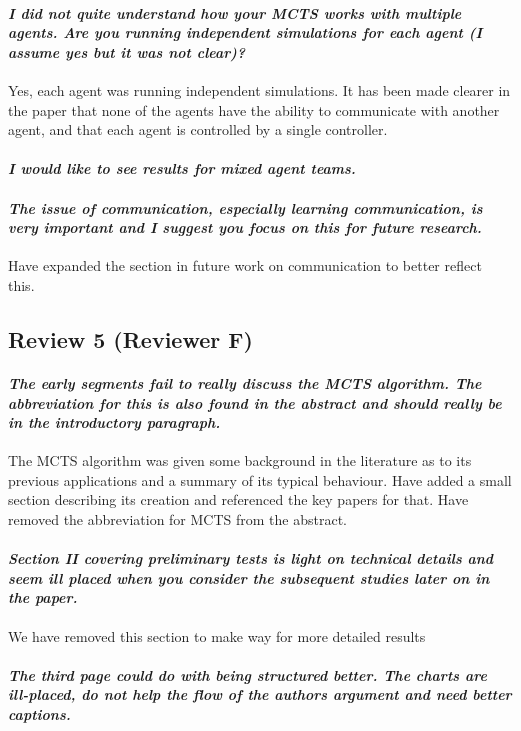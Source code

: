 \documentclass{article}
\begin{document}
\paragraph*{\textit{I did not quite understand how your MCTS works with multiple agents. Are you running independent simulations for each agent (I assume yes but it was not clear)? }}
Yes, each agent was running independent simulations. It has been made clearer in the paper that none of the agents have the ability to communicate with another agent, and that each agent is controlled by a single controller. 
\paragraph*{\textit{I would like to see results for mixed agent teams.}}
\paragraph*{\textit{The issue of communication, especially learning communication, is very important and I suggest you focus on this for future research.}}
Have expanded the section in future work on communication to better reflect this.
\subsection{Review 5 (Reviewer F)}
\paragraph*{\textit{The early segments fail to really discuss the MCTS algorithm.  The abbreviation for this is also found in the abstract and should really be in the introductory paragraph.}}
The MCTS algorithm was given some background in the literature as to its previous applications and a summary of its typical behaviour. Have added a small section describing its creation and referenced the key papers for that.
Have removed the abbreviation for MCTS from the abstract.
\paragraph*{\textit{Section II covering preliminary tests is light on technical details and seem ill placed when you consider the subsequent studies later on in the paper.}}
We have removed this section to make way for more detailed results
\paragraph*{\textit{The third page could do with being structured better.  The charts are ill-placed, do not help the flow of the authors argument and need better captions.}}
\end{document}
